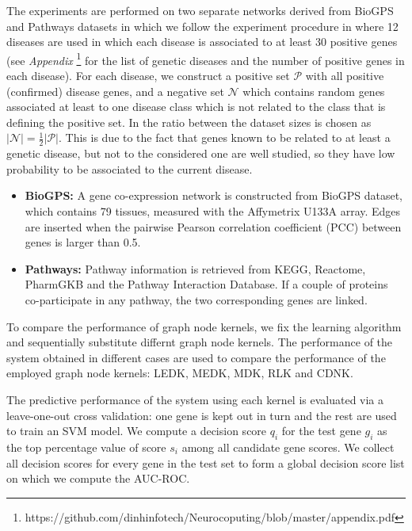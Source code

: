 \documentclass[review]{elsarticle}
\begin{document}
The experiments are performed on two separate networks derived from BioGPS and Pathways datasets in which we follow the experiment procedure in \cite{chen2014disease} where 12 diseases \cite{goh2007human} are used in which each disease is associated to at least 30 positive genes (see \textit{Appendix} \footnote{https://github.com/dinhinfotech/Neurocoputing/blob/master/appendix.pdf} for the list of genetic diseases and the number of positive genes in each disease). For each disease, we construct a positive set $\mathcal{P}$ with all positive (confirmed) disease genes, and a negative set $\mathcal{N}$ which contains random genes associated at least to one disease class which is not related to the class that is defining the positive set. In \cite{chen2014disease} the ratio between the dataset sizes is chosen as $\vert \mathcal{N} \vert = \frac{1}{2} \vert \mathcal{P} \vert$. This is due to the fact that genes known to be related to at least a genetic disease, but not to the considered one are well studied, so they have low probability to be associated to the current disease.
\begin{itemize}
\item \textbf{BioGPS:} A gene co-expression network is constructed from BioGPS dataset, which contains 79 tissues, measured with the Affymetrix U133A array. Edges are inserted when the pairwise Pearson correlation coefficient (PCC) between genes is larger than 0.5.

\item \textbf{Pathways:} Pathway information is retrieved from KEGG, Reactome, PharmGKB and the Pathway Interaction Database. If a couple of proteins co-participate in any pathway, the two corresponding genes are linked.  
\end{itemize}
To compare the performance of graph node kernels, we fix the learning algorithm and sequentially substitute differnt graph node kernels. The performance of the system obtained in different cases are used to compare the performance of the employed graph node kernels: LEDK, MEDK, MDK, RLK and CDNK.

The predictive performance of the system using each kernel is evaluated via a leave-one-out cross validation: one gene is kept out in turn and the rest are used to train an SVM model. We compute a decision score $q_i$ for the test gene $g_i$ as the top percentage value of score $s_i$ among all candidate gene scores. We collect all decision scores for every gene in the test set to form a global decision score list on which we compute the AUC-ROC.
\end{document}
